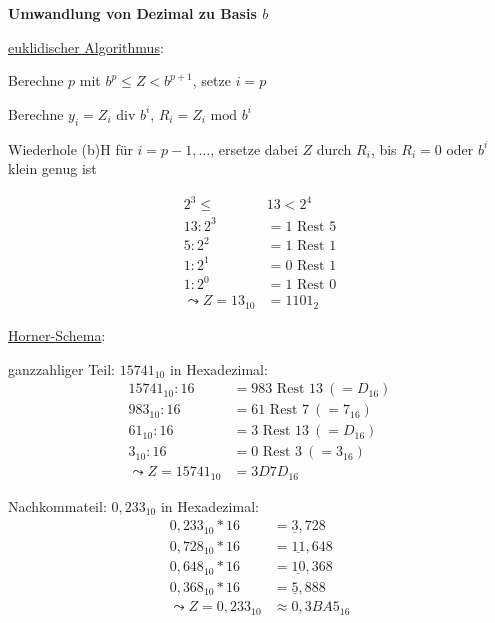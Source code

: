 \textbf{Umwandlung von Dezimal zu Basis $b$}
\begin{enumeration}
	\item \underline{euklidischer Algorithmus}:
	\begin{enumeration}
		\item Berechne $p$ mit $b^p \leq Z < b^{p+1}$, setze $i=p$
		\item Berechne $y_i=Z_i \text{ div } b^i$, $R_i = Z_i \text{ mod } b^i$
		\item Wiederhole (b)H für $i= p-1,\dots$, ersetze dabei $Z$ durch $R_i$, bis $R_i=0$ oder $b^i$ klein genug ist
	\end{enumeration}
	\begin{align*}
		2^3 \leq \ &13 < 2^4 \\
		13:2^3 &= 1 \text{ Rest } 5 \\
		5:2^2 &= 1 \text{ Rest } 1 \\
		1:2^1 &= 0 \text{ Rest } 1 \\
		1:2^0 &= 1 \text{ Rest } 0 \\
		\leadsto Z=13_{10} &= 1101_2
	\end{align*}

	\item \underline{Horner-Schema}:
	\begin{enumeration}
	 	\item ganzzahliger Teil: $15741_{10}$ in Hexadezimal:
			\begin{align*}
				15741_{10}:16 &= 983 \text{ Rest } 13 \ (=D_{16}) \\
				983_{10}:16 &= 61 \text{ Rest } 7 \ (=7_{16}) \\
				61_{10}:16 &= 3 \text{ Rest } 13 \ (=D_{16}) \\
				3_{10}:16 &= 0 \text{ Rest } 3 \ (=3_{16}) \\
				\leadsto Z=15741_{10} &= 3D7D_{16}
			\end{align*}
		\item Nachkommateil: $0,233_{10}$ in Hexadezimal:
			\begin{align*}
				0,233_{10}*16 &= \underline{3},728 \\
				0,728_{10}*16 &= \underline{11},648 \\
				0,648_{10}*16 &= \underline{10},368 \\
				0,368_{10}*16 &= \underline{5},888 \\
				\leadsto Z=0,233_{10} &\approx 0,3BA5_{16}
			\end{align*}
	 \end{enumeration} 
\end{enumeration}

